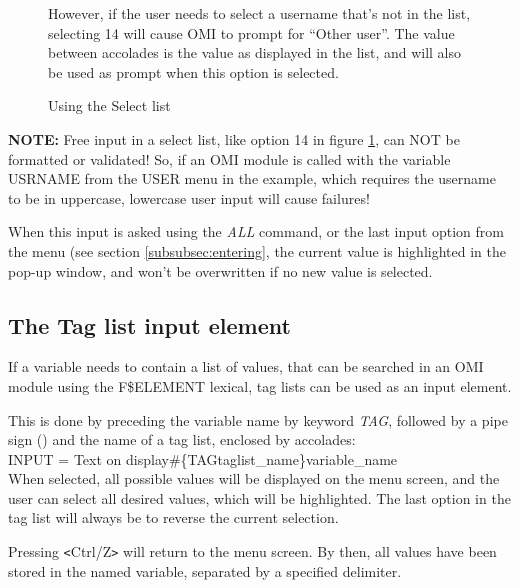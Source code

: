 \documentclass[a4paper]{book}
\newcommand{\vs}{\vspace{3mm}}
\newcommand{\lt}{\texttt{<}}
\newcommand{\gt}{\texttt{>}}
\renewcommand{\indent}{\hspace*{5mm}}
\begin{document}
\begin{figure}[h!tb]
\begin{minipage}[h!tb]{\textwidth}
\noindent However, if the user needs to select a username that's not in the list, 
selecting 14 will cause OMI to prompt for ``Other user''. The value 
between accolades is the value as displayed in the list, and will also be 
used as prompt when this option is selected.

\caption{Using the Select list}\label{fig:freeselect}
\hrulefill
\end{minipage}
\end{figure}

\vs

\hspace{-8mm}\textbf{NOTE:} Free input in a select list, like option 14 in figure \ref{fig:freeselect}, 
can NOT be formatted or validated! So, if an OMI module is called with the 
variable USRNAME from the USER menu in the example, which requires the 
username to be in uppercase, lowercase user input will cause failures!

When this input is asked using the \textsl{ALL} command, or 
the last input option from the menu (see section \ref{subsubsec:entering}, the current value is highlighted in the 
pop-up window, and won't be overwritten if no new value is selected.

\subsection{The Tag list input element}
\label{subsubsec:mylabel40}

If a variable needs to contain a list of values, that can be searched in an 
OMI module using the F{\$}ELEMENT lexical, tag lists can be used as an 
input element.

\vs

This is done by preceding the variable name by keyword \textsl{TAG}, followed by a 
pipe sign (\textbar) and the name of a tag list, enclosed by accolades: \\
\indent\textsf{INPUT = Text on display{\#}{\{}TAG\textbar taglist{\_}name{\}}variable{\_}name} \\
When selected, all possible values will be displayed on the menu screen, and 
the user can select all desired values, which will be highlighted. The last 
option in the tag list will always be to reverse the current selection.

Pressing \lt Ctrl/Z\gt{} will return to the menu screen. By then, all values have 
been stored in the named variable, separated by a specified delimiter.
\end{document}
